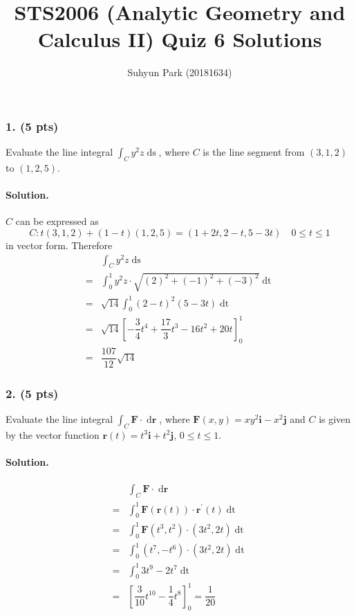 
	


\title{STS2006 (Analytic Geometry and Calculus II) \newline Quiz 6 Solutions}
\author{Suhyun Park (20181634)}
\maketitle

\subsubsection{1. (5 pts)} Evaluate the line integral $\int_C y^2z \mathop{ds}$, where $C$ is the line segment from $\left(3, 1, 2\right)$ to $\left(1, 2, 5\right)$.

\paragraph{Solution.} $C$ can be expressed as
\[C: t\left(3, 1, 2\right) + \left(1-t\right)\left(1, 2, 5\right)=\left(1+2t, 2-t, 5-3t\right) \quad 0\leq t\leq1\]
in vector form. Therefore
\begin{align*}
	& \int_C y^2z \mathop{ds}\\
	=& \int_0^1 y^2z\cdot\sqrt{\left(2\right)^2+\left(-1\right)^2+\left(-3\right)^2}\mathop{dt}\\
	=& \sqrt{14}\int_0^1 \left(2-t\right)^2\left(5-3t\right)\mathop{dt}\\
	=& \sqrt{14}\left[-\dfrac{3}{4}t^4+\dfrac{17}{3}t^3-16t^2+20t\right]_0^1\\
	=& \dfrac{107}{12}\sqrt{14}
\end{align*}
\par

\subsubsection{2. (5 pts)} Evaluate the line integral $\int_C \mathbf{F}\cdot\mathop{d\mathbf{r}}$, where $\mathbf{F}\left(x, y\right)=xy^2\mathbf{i}-x^2\mathbf{j}$ and $C$ is given by the vector function $\mathbf{r}\left(t\right)=t^3\mathbf{i}+t^2\mathbf{j}$, $0\leq t\leq1$.

\paragraph{Solution.}

\begin{align*}
	& \int_C \mathbf{F}\cdot\mathop{d\mathbf{r}}\\
	=& \int_0^1 \mathbf{F}\left(\mathbf{r}\left(t\right)\right)\cdot\mathbf{r}^\prime\left(t\right)\mathop{dt}\\
	=& \int_0^1 \mathbf{F}\left(t^3, t^2\right)\cdot\left(3t^2, 2t\right)\mathop{dt}\\
	=& \int_0^1 \left(t^7, -t^6\right)\cdot\left(3t^2, 2t\right)\mathop{dt}\\
	=& \int_0^1 3t^9-2t^7\mathop{dt}\\
	=& \left[\dfrac{3}{10}t^{10}-\dfrac{1}{4}t^8\right]_0^1 = \dfrac{1}{20}
\end{align*}


